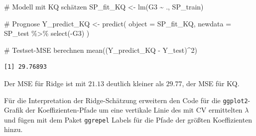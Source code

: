 \documentclass[
  a4paper,
  DIV=11,
  oneside]{scrreprt}
\newenvironment{Shaded}{\begin{snugshade}}{\end{snugshade}}
\newcommand{\AttributeTok}[1]{\textcolor[rgb]{0.40,0.45,0.13}{#1}}
\newcommand{\CommentTok}[1]{\textcolor[rgb]{0.37,0.37,0.37}{#1}}
\newcommand{\DecValTok}[1]{\textcolor[rgb]{0.68,0.00,0.00}{#1}}
\newcommand{\FunctionTok}[1]{\textcolor[rgb]{0.28,0.35,0.67}{#1}}
\newcommand{\NormalTok}[1]{\textcolor[rgb]{0.00,0.23,0.31}{#1}}
\newcommand{\OtherTok}[1]{\textcolor[rgb]{0.00,0.23,0.31}{#1}}
\newcommand{\SpecialCharTok}[1]{\textcolor[rgb]{0.37,0.37,0.37}{#1}}
\begin{document}
\begin{Shaded}
\begin{Highlighting}[]
\CommentTok{\# Modell mit KQ schätzen}
\NormalTok{SP\_fit\_KQ }\OtherTok{\textless{}{-}} \FunctionTok{lm}\NormalTok{(G3 }\SpecialCharTok{\textasciitilde{}}\NormalTok{ ., SP\_train)}

\CommentTok{\# Prognose}
\NormalTok{Y\_predict\_KQ }\OtherTok{\textless{}{-}} \FunctionTok{predict}\NormalTok{(}
  \AttributeTok{object =}\NormalTok{ SP\_fit\_KQ, }
  \AttributeTok{newdata =}\NormalTok{ SP\_test }\SpecialCharTok{\%\textgreater{}\%} 
    \FunctionTok{select}\NormalTok{(}\SpecialCharTok{{-}}\NormalTok{G3)}
\NormalTok{)}

\CommentTok{\# Testset{-}MSE berechnen}
\FunctionTok{mean}\NormalTok{((Y\_predict\_KQ }\SpecialCharTok{{-}}\NormalTok{ Y\_test)}\SpecialCharTok{\^{}}\DecValTok{2}\NormalTok{)}
\end{Highlighting}
\end{Shaded}

\begin{verbatim}
[1] 29.76893
\end{verbatim}

Der MSE für Ridge ist mit \(21.13\) deutlich kleiner als \(29.77\), der
MSE für KQ.

Für die Interpretation der Ridge-Schätzung erweitern den Code für die
\texttt{ggplot2}-Grafik der Koeffizienten-Pfade um eine vertikale Linie
des mit CV ermittelten \(\lambda\) und fügen mit dem Paket
\texttt{ggrepel} Labels für die Pfade der größten Koeffizienten hinzu.
\end{document}
